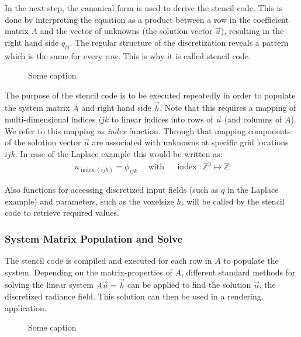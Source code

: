 In the next step, the canonical form is used to derive the stencil code. This is done by interpreting the equation as a product between a row in the coefficient matrix $A$ and the vector of unknowns (the solution vector $\vec{u}$), resulting in the right hand side $q_{ij}$. The regular structure of the discretization reveals a pattern which is the same for every row. This is why it is called stencil code.
\begin{figure}[h]
\centering
{}
\caption{Some caption}
\label{fig:pn_solver_stencil_code}
\end{figure}

The purpose of the stencil code is to be executed repeatedly in order to populate the system matrix $A$ and right hand side $\vec{b}$. Note that this requires a mapping of multi-dimensional indices $ijk$ to linear indices into rows of $\vec{u}$ (and columns of $A$). We refer to this mapping as \emph{index} function. Through that mapping components of the solution vector $\vec{u}$ are associated with unknowns at specific grid locations $ijk$. In case of the Laplace example this would be written as:
\begin{align}
u_{\operatorname{index}\left(ijk\right)} = \phi_{ijk}\quad\text{ with }\quad \operatorname{index}: \mathbb{Z}^3\mapsto\mathbb{Z}
\label{eq:pn_index_mapping}
\end{align}

Also functions for accessing discretized input fields (such as $q$ in the Laplace example) and parameters, such as the voxelsize $h$, will be called by the stencil code to retrieve required values.

\subsubsection*{System Matrix Population and Solve}
The stencil code is compiled and executed for each row in $A$ to populate the system. Depending on the matrix-properties of $A$, different standard methods for solving the linear system $A\vec{u}=\vec{b}$ can be applied to find the solution $\vec{u}$, the discretized radiance field. This solution can then be used in a rendering application.
\begin{figure}[h]
\centering
{}
\caption{Some caption}
\label{fig:pn_solver_stencil_overview}
\end{figure}

